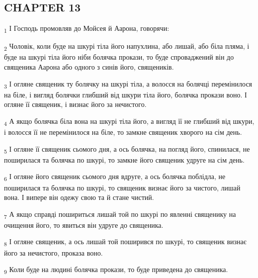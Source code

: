\subsection{CHAPTER 13}
\begin{tcolorbox}
\textsubscript{1} І Господь промовляв до Мойсея й Аарона, говорячи:
\end{tcolorbox}
\begin{tcolorbox}
\textsubscript{2} Чоловік, коли буде на шкурі тіла його напухлина, або лишай, або біла пляма, і буде на шкурі тіла його ніби болячка прокази, то буде спроваджений він до священика Аарона або одного з синів його, священиків.
\end{tcolorbox}
\begin{tcolorbox}
\textsubscript{3} І огляне священик ту болячку на шкурі тіла, а волосся на болячці перемінилося на біле, і вигляд болячки глибший від шкури тіла його, болячка прокази воно. І огляне її священик, і визнає його за нечистого.
\end{tcolorbox}
\begin{tcolorbox}
\textsubscript{4} А якщо болячка біла вона на шкурі тіла його, а вигляд її не глибший від шкури, і волосся її не перемінилося на біле, то замкне священик хворого на сім день.
\end{tcolorbox}
\begin{tcolorbox}
\textsubscript{5} І огляне її священик сьомого дня, а ось болячка, на погляд його, спинилася, не поширилася та болячка по шкурі, то замкне його священик удруге на сім день.
\end{tcolorbox}
\begin{tcolorbox}
\textsubscript{6} І огляне його священик сьомого дня вдруге, а ось болячка поблідла, не поширилася та болячка по шкурі, то священик визнає його за чистого, лишай вона. І випере він одежу свою та й стане чистий.
\end{tcolorbox}
\begin{tcolorbox}
\textsubscript{7} А якщо справді пошириться лишай той по шкурі по явленні священику на очищення його, то явиться він удруге до священика.
\end{tcolorbox}
\begin{tcolorbox}
\textsubscript{8} І огляне священик, а ось лишай той поширився по шкурі, то священик визнає його за нечистого, проказа воно.
\end{tcolorbox}
\begin{tcolorbox}
\textsubscript{9} Коли буде на людині болячка прокази, то буде приведена до священика.
\end{tcolorbox}
